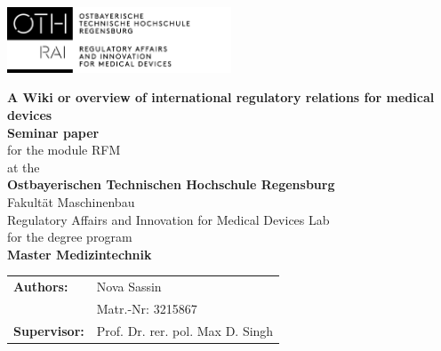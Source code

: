 \documentclass[11pt,a4paper,bibliography=totoc,listof=totoc,pointlessnumbers,open=any]{scrbook}
\begin{document}
\pagestyle{scrheadings}

\newpage
\thispagestyle{empty}
\begin{flushleft}
	\includegraphics[width=0.5\textwidth]{Titel/OTH_Logo_RAI.jpg}
\end{flushleft}

\begin{centering}
	\bigskip 
	\bigskip
	\bigskip
	\bigskip		
	\bigskip
	\huge\textrm{\textbf{A Wiki or overview of international regulatory relations for medical devices }}\\
	\bigskip
	\bigskip
	\bigskip 
	\bigskip 
	\bigskip
		\bigskip
		\bigskip 
		\bigskip
		\bigskip
	\LARGE\textrm{\textbf{Seminar paper}}\\
	\bigskip
	\small\textrm{for the module RFM}\\
	\smallskip
	\small\textrm{at the}\\
	\smallskip
	\large\textrm{\textbf{Ostbayerischen Technischen Hochschule Regensburg}}\\
	\smallskip
	\small\textrm{Fakultät Maschinenbau}\\
	\smallskip
	\small\textrm{Regulatory Affairs and Innovation for Medical Devices Lab}\\
	\smallskip
	\small\textrm{for the degree program}\\
	\smallskip
	\large\textrm{\textbf{Master Medizintechnik}}
	\bigskip 
	\bigskip 
	\bigskip
	\bigskip
	\bigskip 
	\bigskip
	\bigskip 
	\bigskip
	\bigskip 
    \begin{table}[H]
    	\flushleft
    	\renewcommand{\arraystretch}{1.2}
    	\begin{tabular}{ll}
    	\textbf{Authors:} & \textrm{Nova Sassin} \\ 
    	 & \textrm{Matr.-Nr: } 3215867 \\
    
    	\textbf{Supervisor:} & \textrm{Prof. Dr. rer. pol. Max D. Singh }
    	\end{tabular}
    \end{table}
\end{centering}

\newpage
\tableofcontents 
\end{document}
